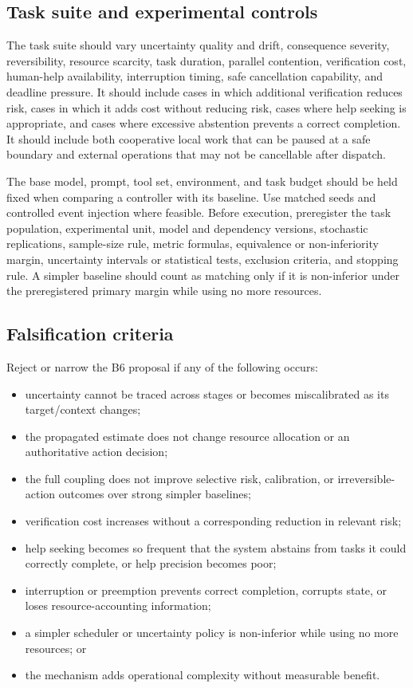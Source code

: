 \subsection{Task suite and experimental controls}
\label{sec:ch16-task-suite}

The task suite should vary uncertainty quality and drift, consequence severity, reversibility, resource scarcity, task duration, parallel contention, verification cost, human-help availability, interruption timing, safe cancellation capability, and deadline pressure. It should include cases in which additional verification reduces risk, cases in which it adds cost without reducing risk, cases where help seeking is appropriate, and cases where excessive abstention prevents a correct completion. It should include both cooperative local work that can be paused at a safe boundary and external operations that may not be cancellable after dispatch.

The base model, prompt, tool set, environment, and task budget should be held fixed when comparing a controller with its baseline. Use matched seeds and controlled event injection where feasible. Before execution, preregister the task population, experimental unit, model and dependency versions, stochastic replications, sample-size rule, metric formulas, equivalence or non-inferiority margin, uncertainty intervals or statistical tests, exclusion criteria, and stopping rule. A simpler baseline should count as matching only if it is non-inferior under the preregistered primary margin while using no more resources.

\subsection{Falsification criteria}
\label{sec:ch16-falsification}

Reject or narrow the B6 proposal if any of the following occurs:

\begin{itemize}
  \item uncertainty cannot be traced across stages or becomes miscalibrated as its target/context changes;
  \item the propagated estimate does not change resource allocation or an authoritative action decision;
  \item the full coupling does not improve selective risk, calibration, or irreversible-action outcomes over strong simpler baselines;
  \item verification cost increases without a corresponding reduction in relevant risk;
  \item help seeking becomes so frequent that the system abstains from tasks it could correctly complete, or help precision becomes poor;
  \item interruption or preemption prevents correct completion, corrupts state, or loses resource-accounting information;
  \item a simpler scheduler or uncertainty policy is non-inferior while using no more resources; or
  \item the mechanism adds operational complexity without measurable benefit.
\end{itemize}

